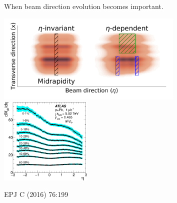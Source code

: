\documentclass[11pt]{beamer}
\begin{document}
\begin{frame}{When beam direction evolution becomes important.}
\begin{overprint}
\includegraphics[width=0.67\textwidth]{nuclei_demo_02.pdf}
\includegraphics[width=0.33\textwidth]{pPb-ATLAS.png}\\
\end{overprint}
\hspace{9cm}\tiny EPJ C (2016) 76:199
\end{frame}
\end{document}

